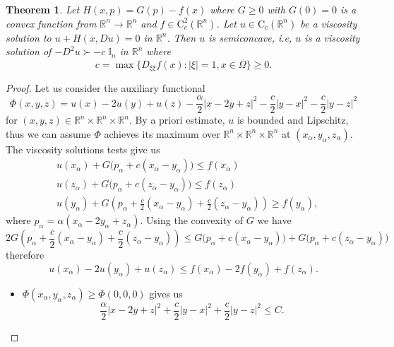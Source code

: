 \documentclass[12pt,reqno]{amsart}
\numberwithin{figure}{section}
\theoremstyle{plain}
\newtheorem{thm}{Theorem}[section]
\theoremstyle{remark}
\numberwithin{equation}{section}
\newcommand{\R}{\mathbb{R}}
\begin{document}
\begin{thm}\label{convex} Let $H(x,p) = G(p)-f(x)$ where $G\geq 0$ with $G(0) = 0$ is a convex function from $\R^n\to\R^n$ and $f\in \mathrm{C}^2_c(\R^n)$. Let $u\in \mathrm{C}_c(\R^n)$ be a viscosity solution to $u+H(x,Du) = 0$ in $\R^n$. Then $u$ is semiconcave, i.e, $u$ is a viscosity solution of  $-D^2u \succ -c\;\mathbb{I}_n$ in $\R^n$ where 
\begin{equation*}
    c = \max \big\lbrace  D_{\xi\xi}f(x): |\xi|=1, x\in \overline{\Omega} \big\rbrace\geq 0.
\end{equation*}
\end{thm}
\begin{proof} Let us consider the auxiliary functional
\begin{equation*}
    \Phi(x,y,z) = u(x)-2u(y)+u(z) - \frac{\alpha}{2}|x-2y+z|^2 - \frac{c}{2}|y-x|^2-\frac{c}{2}|y-z|^2
\end{equation*}
for $(x,y,z)\in \R^n\times\R^n\times\R^n$. By a priori estimate, $u$ is bounded and Lipschitz, thus we can assume $\Phi$ achieves its maximum over $\R^n\times\R^n\times \R^n$ at $(x_\alpha,y_\alpha,z_\alpha)$. The viscosity solutions tests give us
\begin{align*}
    &u(x_\alpha) + G\big(p_\alpha+c(x_\alpha-y_\alpha)\big) \leq f(x_\alpha)\\
    &u(z_\alpha) + G\big(p_\alpha+c(z_\alpha-y_\alpha)\big) \leq f(z_\alpha)\\
    &u(y_\alpha) + G\left(p_\alpha+\frac{c}{2}(x_\alpha-y_\alpha) + \frac{c}{2}(z_\alpha-y_\alpha)\right) \geq f(y_\alpha),
\end{align*}
where $p_\alpha = \alpha(x_\alpha-2y_\alpha+z_\alpha)$. Using the convexity of $G$ we have
\begin{equation*}
    2G\left(p_\alpha+\frac{c}{2}(x_\alpha-y_\alpha) + \frac{c}{2}(z_\alpha-y_\alpha)\right) \leq G\big(p_\alpha+c(x_\alpha-y_\alpha)\big)  + G\big(p_\alpha+c(z_\alpha-y_\alpha)\big)
\end{equation*}
therefore
\begin{equation*}
    u(x_\alpha) - 2u(y_\alpha) + u(z_\alpha) \leq f(x_\alpha) - 2f(y_\alpha) + f(z_\alpha).
\end{equation*}
\begin{itemize}
    \item $\Phi(x_\alpha,y_\alpha,z_\alpha)\geq \Phi(0,0,0)$ gives us
    \begin{equation*}
        \frac{\alpha}{2}|x-2y+z|^2 + \frac{c}{2}|y-x|^2+\frac{c}{2}|y-z|^2 \leq C.
    \end{equation*}

\end{itemize}
\end{proof}
\end{document}
